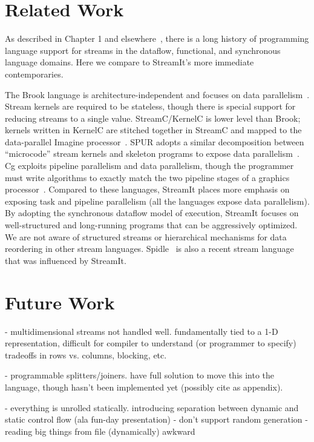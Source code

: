 \section{Related Work}
\label{sec:lang-related}

As described in Chapter 1 and elsewhere~\cite{survey97}, there is a
long history of programming language support for streams in the
dataflow, functional, and synchronous language domains.  Here we
compare to StreamIt's more immediate contemporaries.

The Brook language is architecture-independent and focuses on data
parallelism~\cite{brook04}.  Stream kernels are required to be
stateless, though there is special support for reducing streams to a
single value.  Stream\-C/Ker\-nel\-C is lower level than Brook;
kernels written in KernelC are stitched together in StreamC and mapped
to the data-parallel Imagine processor~\cite{imagine03ieee}.  SPUR
adopts a similar decomposition between ``microcode'' stream kernels
and skeleton programs to expose data parallelism~\cite{spur05samos}.
Cg exploits pipeline parallelism and data parallelism, though the
programmer must write algorithms to exactly match the two pipeline
stages of a graphics processor~\cite{cg03}.  Compared to these
languages, StreamIt places more emphasis on exposing task and pipeline
parallelism (all the languages expose data parallelism).
By adopting the synchronous dataflow model of execution, StreamIt
focuses on well-structured and long-running programs that can be
aggressively optimized.  We are not aware of structured streams or
hierarchical mechanisms for data reordering in other stream languages.
Spidle~\cite{spidle03} is also a recent stream language that was
influenced by StreamIt.

\section{Future Work}

- multidimensional streams not handled well.  fundamentally tied to a
1-D representation, difficult for compiler to understand (or
programmer to specify) tradeoffs in rows vs. columns, blocking, etc.

- programmable splitters/joiners.  have full solution to move this
into the language, though hasn't been implemented yet (possibly cite
as appendix).

- everything is unrolled statically.  introducing separation between
  dynamic and static control flow (ala fun-day presentation)
  - don't support random generation
  - reading big things from file (dynamically) awkward

